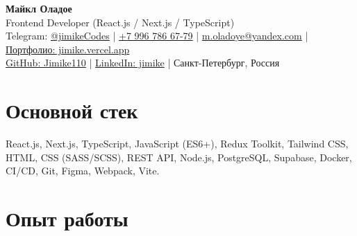 \documentclass[a4paper,11pt]{article}
\begin{document}
\begin{center}
    {\Huge \textbf{Майкл Оладое}} \\[5pt]
    {\large Frontend Developer (React.js / Next.js / TypeScript)} \\[6pt]
    Telegram: \href {https://t.me/jimikeCodes}{@jimikeCodes} \quad|\quad
    \href{tel:+79967866779}{+7 996 786 67-79} \quad|\quad
    \href{mailto:m.oladoye@yandex.com}{m.oladoye@yandex.com} \quad|\quad
    \href{https://jimike.vercel.app}{Портфолио: jimike.vercel.app} \\[4pt]
    \href{https://github.com/Jimike110}{GitHub: Jimike110} \quad|\quad
    \href{https://www.linkedin.com/in/jimike}{LinkedIn: jimike} \quad|\quad
    Санкт-Петербург, Россия
\end{center}


\section*{Основной стек}
React.js, Next.js, TypeScript, JavaScript (ES6+), Redux Toolkit, Tailwind CSS, HTML, CSS (SASS/SCSS), REST API, Node.js, PostgreSQL, Supabase, Docker, CI/CD, Git, Figma, Webpack, Vite.

\section*{Опыт работы}
\end{document}
